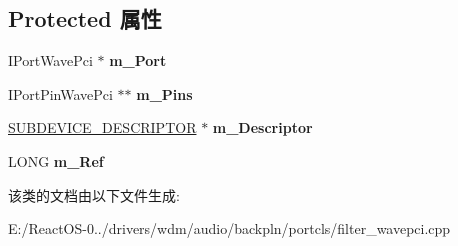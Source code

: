 \subsection*{Protected 属性}
\begin{DoxyCompactItemize}
\item 
\mbox{\label{class_c_port_filter_wave_pci_a8655e7b596ac4a7d09b59c5472a571c7}} 
I\+Port\+Wave\+Pci $\ast$ {\bfseries m\+\_\+\+Port}
\item 
\mbox{\label{class_c_port_filter_wave_pci_abf82840753890181465802bc8f21340d}} 
I\+Port\+Pin\+Wave\+Pci $\ast$$\ast$ {\bfseries m\+\_\+\+Pins}
\item 
\mbox{\label{class_c_port_filter_wave_pci_a4f0426b7767670a1958e230cff719b13}} 
\hyperlink{struct_s_u_b_d_e_v_i_c_e___d_e_s_c_r_i_p_t_o_r}{S\+U\+B\+D\+E\+V\+I\+C\+E\+\_\+\+D\+E\+S\+C\+R\+I\+P\+T\+OR} $\ast$ {\bfseries m\+\_\+\+Descriptor}
\item 
\mbox{\label{class_c_port_filter_wave_pci_abf5d1b620dcd8c27070ee4d354a00f1c}} 
L\+O\+NG {\bfseries m\+\_\+\+Ref}
\end{DoxyCompactItemize}


该类的文档由以下文件生成\+:\begin{DoxyCompactItemize}
\item 
E\+:/\+React\+O\+S-\/0../drivers/wdm/audio/backpln/portcls/filter\+\_\+wavepci.\+cpp\end{DoxyCompactItemize}

